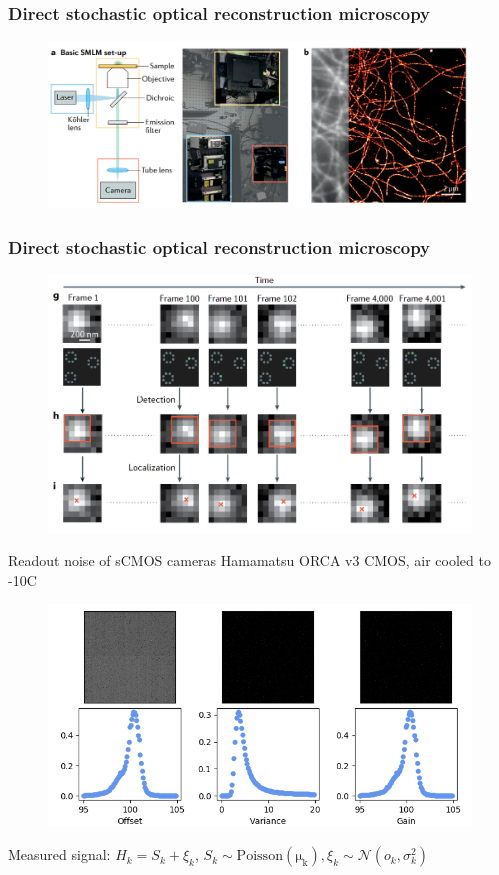 \documentclass{beamer}					%
\begin{document}
\begin{frame}
\frametitle{Direct stochastic optical reconstruction microscopy}

\begin{figure}
\includegraphics[width=\textwidth]{Setup.png}
\end{figure}
  
\end{frame}

\begin{frame}
\frametitle{Direct stochastic optical reconstruction microscopy}

\begin{figure}
\includegraphics[width=13cm]{Localization.png}
\end{figure}
  
\end{frame}


\begin{frame}{Readout noise of sCMOS cameras}
Hamamatsu ORCA v3 CMOS, air cooled to -10C
\begin{figure}
\includegraphics[width=12cm]{Noise-Maps.png}
\end{figure}
Measured signal: $H_{k} = S_{k} + \xi_{k}$, $S_{k}\sim \mathrm{Poisson(\mu_{k})}, \xi_{k}\sim \mathcal{N}(o_{k},\sigma_{k}^{2})$
\end{frame}
\end{document}
